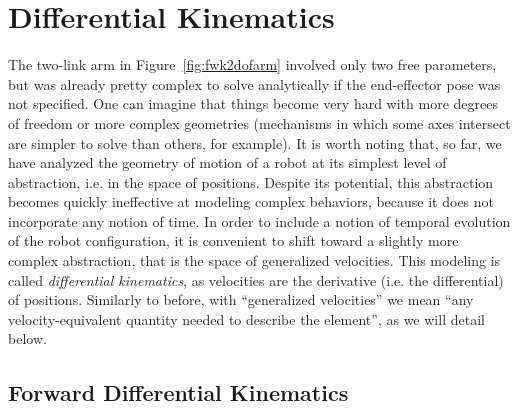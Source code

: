 \section{Differential Kinematics}\label{sec:kinematics:diff}

The two-link arm in Figure~\ref{fig:fwk2dofarm} involved only two free parameters, but was already pretty complex to solve analytically if the end-effector pose was not specified.
One can imagine that things become very hard with more degrees of freedom or more complex geometries (mechanisms in which some axes intersect are simpler to solve than others, for example).
It is worth noting that, so far, we have analyzed the geometry of motion of a robot at its simplest level of abstraction, i.e. in the space of positions. Despite its potential, this abstraction becomes quickly ineffective at modeling complex behaviors, because it does not incorporate any notion of time.
In order to include a notion of temporal evolution of the robot configuration, it is convenient to shift toward a slightly more complex abstraction, that is the space of generalized velocities. This modeling is called \textsl{differential kinematics}, as velocities are the derivative (i.e. the differential) of positions.
Similarly to before, with ``generalized velocities'' we mean ``any velocity-equivalent quantity needed to describe the element'', as we will detail below.

\subsection{Forward Differential Kinematics}\label{sec:kinematics:diff:fwd}

